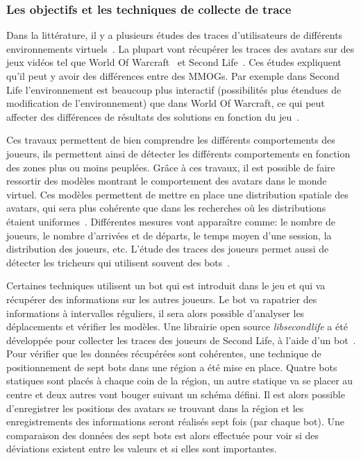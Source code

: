 		\subsubsection{Les objectifs et les techniques de collecte de trace}
		\par Dans la littérature, il y a plusieurs études des traces d'utilisateurs de différents environnements virtuels~\cite{1326262,0295-5075-88-4-48007}. La plupart vont récupérer les traces des avatars sur des jeux vidéos tel que World Of Warcraft~\cite{wow} et Second Life~\cite{sl}. Ces études expliquent qu'il peut y avoir des différences entre des MMOGs. Par exemple dans Second Life l'environnement est beaucoup plus interactif (possibilités plus étendues de modification de l'environnement) que dans World Of Warcraft, ce qui peut affecter des différences de résultats des solutions en fonction du jeu~\cite{DBLP:journals/corr/abs-0807-2328,1613041}. \\
\par Ces travaux permettent de bien comprendre les différents comportements des joueurs, ils permettent ainsi de détecter les différents comportements en fonction des zones plus ou moins peuplées. Grâce à ces travaux, il est possible de faire ressortir des modèles montrant le comportement des avatars dans le monde virtuel. Ces modèles permettent de mettre en place une distribution spatiale des avatars, qui sera plus cohérente que dans les recherches où les distributions étaient uniformes~\cite{Knutsson04peer-to-peersupport}. Différentes mesures vont apparaître comme: le nombre de joueurs, le nombre d'arrivées et de départs, le temps moyen d'une session, la distribution des joueurs, etc. L'étude des traces des joueurs permet aussi de détecter les tricheurs qui utilisent souvent des bots~\cite{0295-5075-88-4-48007}. \\
	\par Certaines techniques utilisent un bot qui est introduit dans le jeu et qui va récupérer des informations sur les autres joueurs. Le bot va rapatrier des informations à intervalles réguliers, il sera alors possible d'analyser les déplacements et vérifier les modèles. Une librairie open source \textit{libsecondlife} a été développée pour collecter les traces des joueurs de Second Life, à l'aide d'un bot~\cite{DBLP:journals/corr/abs-0807-2328}. Pour vérifier que les données récupérées sont cohérentes, une technique de positionnement de sept bots dans une région a été mise en place. Quatre bots statiques sont placés à chaque coin de la région, un autre statique va se placer au centre et deux autres vont bouger suivant un schéma défini. Il est alors possible d'enregistrer les positions des avatars se trouvant dans la région et les enregistrements des informations seront réalisés sept fois (par chaque bot). Une comparaison des données des sept bots est alors effectuée pour voir si des déviations existent entre les valeurs et si elles sont importantes.\\  

